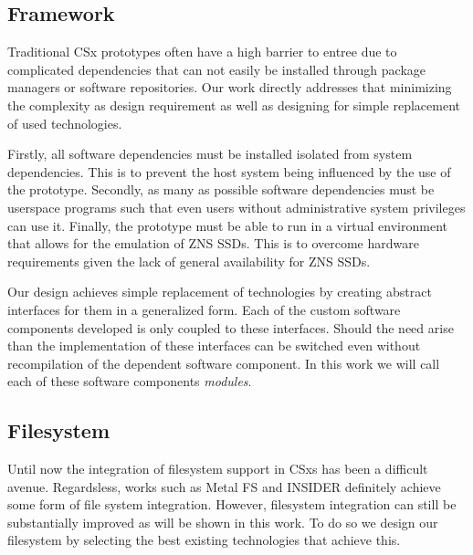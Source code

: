\subsection{Framework}

Traditional CSx prototypes often have a high barrier to entree due to
complicated dependencies that can not easily be installed through package
managers or software repositories. Our work directly addresses that minimizing
the complexity as design requirement as well as designing for simple
replacement of used technologies.

Firstly, all software dependencies must be installed isolated from system
dependencies. This is to prevent the host system being influenced by the use
of the prototype. Secondly, as many as possible software dependencies must be
userspace programs such that even users without administrative system
privileges can use it. Finally, the prototype must be able to run in a virtual
environment that allows for the emulation of ZNS SSDs. This is to overcome
hardware requirements given the lack of general availability for ZNS SSDs.

Our design achieves simple replacement of technologies by creating abstract
interfaces for them in a generalized form. Each of the custom software
components developed is only coupled to these interfaces. Should the need arise
than the implementation of these interfaces can be switched even without
recompilation of the dependent software component. In this work we will call
each of these software components \textit{modules}.

\subsection{Filesystem}

Until now the integration of filesystem support in CSxs has been a difficult
avenue. Regardsless, works such as Metal FS \cite{10.1145/3415580} and INSIDER
\cite{234968} definitely achieve some form of file system integration. However,
filesystem integration can still be substantially improved as will be shown in
this work. To do so we design our filesystem by selecting the best existing
technologies that achieve this.

